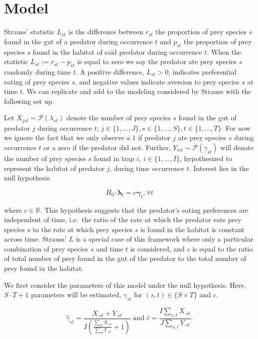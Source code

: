 \section*{Model}
Strauss' statistic $L_{st}$ \cite{Strauss:1979} is the difference between $r_{st}$ the proportion of prey species $s$ found in the gut of a predator during occurrence $t$ and $p_{st}$ the proportion of prey species $s$ found in the habitat of said predator during occurrence $t$.  When the statistic $L_{st} := r_{st} - p_{st}$ is equal to zero we say the predator ate prey species $s$ randomly during time $t$.  A positive difference, $L_{st} > 0$, indicates preferential eating of prey species $s$, and negative values indicate aversion to prey species $s$ at time $t$.  We can replicate and add to the modeling considered by Strauss with the following set up.

Let $X_{jst} \sim \mathcal{P}(\lambda_{st})$ denote the number of prey species $s$ found in the gut of predator $j$ during occurrence $t$; $j \in \{1, \ldots, J\}, s \in \{1, \ldots, S\}, t \in \{1, \ldots, T\}$.  For now we ignore the fact that we only observe a $1$ if predator $j$ ate prey species $s$ during occurrence $t$ or a zero if the predator did not.  Further, $Y_{ist} \sim \mathcal{P}(\gamma_{st})$ will denote the number of prey species $s$ found in trap $i$, $i \in \{1, \ldots, I \}$, hypothesized to represent the habitat of predator $j$, during time occurrence $t$.  Interest lies in the null hypothesis

\begin{equation}
  \label{eq:null}
  H_0: \boldsymbol{\lambda}_t = c \boldsymbol{\gamma}_t, \forall t
\end{equation}

where $c \in \mathbb{R}$.  This hypothesis suggests that the predator's eating preferences are independent of time, i.e.\ the ratio of the rate at which the predator eats prey species $s$ to the rate at which prey species $s$ is found in the habitat is constant across time.  Strauss' $L$ is a special case of this framework where only a particular combination of prey species $s$ and time $t$ is considered, and $c$ is equal to the ratio of total number of prey found in the gut of the predator to the total number of prey found in the habitat.  

We first consider the parameters of this model under the null hypothesis.  Here, $S\cdot T + 1$ parameters will be estimated, $\gamma_{st}$ for $(s,t) \in \{S \times T\}$ and $c$. 

\begin{equation*}
  \hat{\gamma}_{st} = \frac{X_{\cdot st} + Y_{\cdot st}}{I\left(\frac{\sum_{st} X_{\cdot st}}{\sum_{st}Y_{\cdot st}} +1 \right)} \text{ and } \hat{c} = \frac{I\sum_{s,t} X_{\cdot st}}{J\sum_{s,t} Y_{\cdot st}}.
\end{equation*}

